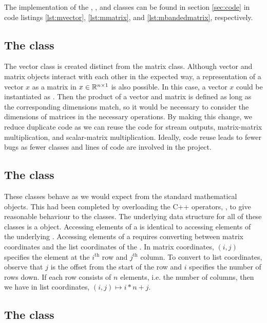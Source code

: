 The implementation of the , , and  classes can be found in  section \ref{sec:code} in code listings \ref{lst:mvector}, \ref{lst:mmatrix}, and \ref{lst:mbandedmatrix}, respectively.

\subsection{The  class}

The vector class is created distinct from the matrix class.
Although vector and matrix objects interact with each other in the expected way, a representation of a vector $x$ as a matrix in $x\in\mathbb{R}^{n\times 1}$ is also possible.
In this case, a vector $x$ could be instantiated as .
Then the product of a vector and matrix is defined as long as the corresponding dimensions match, so it would be necessary to consider the dimensions of matrices in the necessary operations.
By making this change, we reduce duplicate code as we can reuse the code for stream outputs, matrix-matrix multiplication, and scalar-matrix multiplication.
Ideally, code reuse leads to fewer bugs as fewer classes and lines of code are involved in the project.

\subsection{The  class}

These classes behave as we would expect from the standard mathematical objects. 
This had been completed by overloading the C++ operators, \inline{+, -, *, /}, to give reasonable behaviour to the classes.
The underlying data structure for all of these classes is a  object.
Accessing elements of a  is identical to accessing elements of the underlying .
Accessing elements of a  requires converting between matrix coordinates and the list coordinates of the .
In matrix coordinates, $(i,j)$ specifies the element at the $i^\mathrm{th}$ row and $j^\mathrm{th}$ column.
To convert to list coordinates, observe that $j$ is the offset from the start of the row and $i$ specifies the number of rows down.
If each row consists of $n$ elements, i.e. the number of columns, then we have in list coordinates, $(i,j) \mapsto i*n + j$.


\subsection{The  class}

